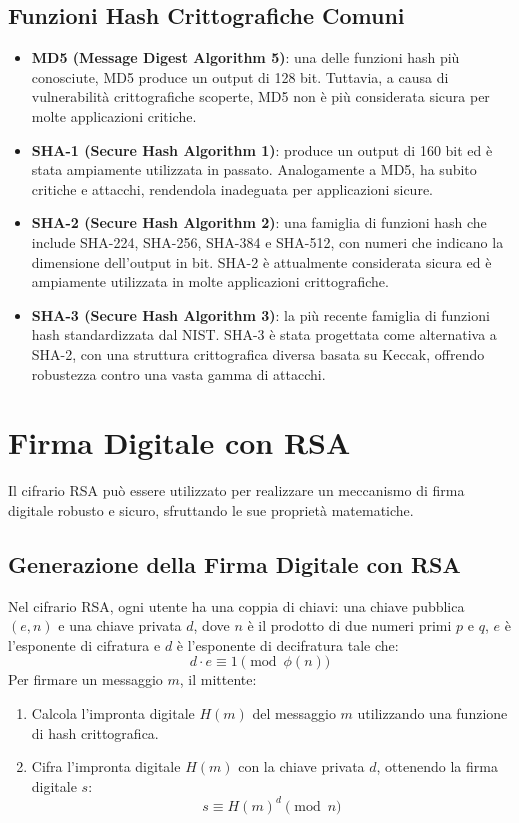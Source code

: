 \documentclass[a4paper,12pt]{report}
\begin{document}
\subsection*{Funzioni Hash Crittografiche Comuni}
\begin{itemize}
    \item \textbf{MD5 (Message Digest Algorithm 5)}: una delle funzioni hash più conosciute, MD5 produce un output di 128 bit. Tuttavia, a causa di vulnerabilità crittografiche scoperte, MD5 non è più considerata sicura per molte applicazioni critiche.
    \item \textbf{SHA-1 (Secure Hash Algorithm 1)}: produce un output di 160 bit ed è stata ampiamente utilizzata in passato. Analogamente a MD5, ha subito critiche e attacchi, rendendola inadeguata per applicazioni sicure.
    \item \textbf{SHA-2 (Secure Hash Algorithm 2)}: una famiglia di funzioni hash che include SHA-224, SHA-256, SHA-384 e SHA-512, con numeri che indicano la dimensione dell'output in bit. SHA-2 è attualmente considerata sicura ed è ampiamente utilizzata in molte applicazioni crittografiche.
    \item \textbf{SHA-3 (Secure Hash Algorithm 3)}: la più recente famiglia di funzioni hash standardizzata dal NIST. SHA-3 è stata progettata come alternativa a SHA-2, con una struttura crittografica diversa basata su Keccak, offrendo robustezza contro una vasta gamma di attacchi.
\end{itemize}

\section{Firma Digitale con RSA}
Il cifrario RSA può essere utilizzato per realizzare un meccanismo di firma digitale robusto e sicuro, sfruttando le sue proprietà matematiche.

\subsection*{Generazione della Firma Digitale con RSA}
Nel cifrario RSA, ogni utente ha una coppia di chiavi: una chiave pubblica $(e, n)$ e una chiave privata $d$, dove $n$ è il prodotto di due numeri primi $p$ e $q$, $e$ è l'esponente di cifratura e $d$ è l'esponente di decifratura tale che:
\[d \cdot e \equiv 1 \pmod{\phi(n)}\]
Per firmare un messaggio $m$, il mittente:

\begin{enumerate}
    \item Calcola l'impronta digitale $H(m)$ del messaggio $m$ utilizzando una funzione di hash crittografica.
    \item Cifra l'impronta digitale $H(m)$ con la chiave privata $d$, ottenendo la firma digitale $s$:
    \[ s \equiv H(m)^d \pmod{n}\]
\end{enumerate}
\end{document}
